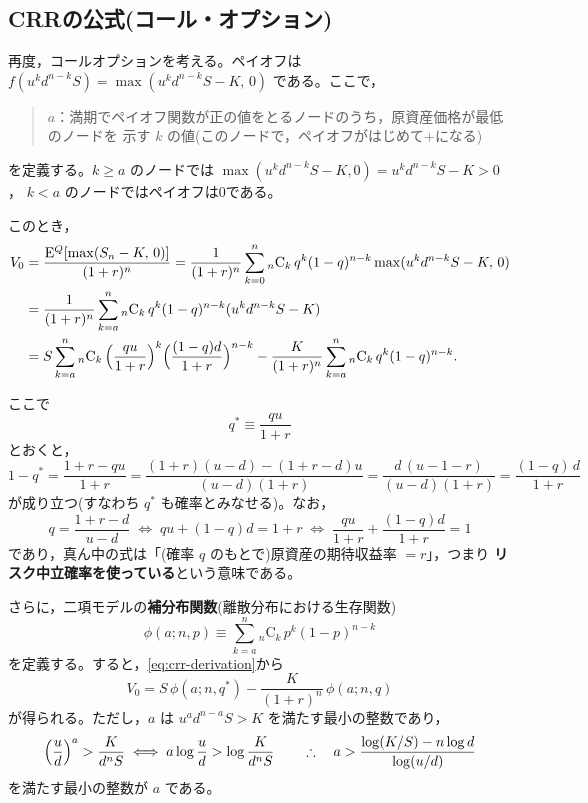 \subsection{CRRの公式(コール・オプション)}

再度，コールオプションを考える。ペイオフは
$f(u^kd^{n-k}S) = \max(u^kd^{n-k}S - K,\,0)$ である。ここで，
\begin{quote}
$a$：満期でペイオフ関数が正の値をとるノードのうち，原資産価格が最低のノードを
示す $k$ の値(このノードで，ペイオフがはじめて$+$になる)
\end{quote}
を定義する。$k\geq a$ のノードでは $\max(u^kd^{n-k}S-K,0) = u^kd^{n-k}S-K > 0$，
$k<a$ のノードではペイオフは0である。

このとき，
\begin{align}
V_0 &= \frac{\mathrm{E}^Q[\max(S_n - K,\,0)]}{(1+r)^n}
= \frac{1}{(1+r)^n}\sum_{k=0}^{n}{}_n\mathrm{C}_k\,q^k(1-q)^{n-k}
\max(u^kd^{n-k}S - K,\,0)\notag\\
&= \frac{1}{(1+r)^n}\sum_{k=a}^{n}{}_n\mathrm{C}_k\,q^k(1-q)^{n-k}
(u^kd^{n-k}S - K)\notag\\
&= S\sum_{k=a}^{n}{}_n\mathrm{C}_k\,
\Bigl(\frac{qu}{1+r}\Bigr)^k\Bigl(\frac{(1-q)d}{1+r}\Bigr)^{n-k}
- \frac{K}{(1+r)^n}\sum_{k=a}^{n}{}_n\mathrm{C}_k\,q^k(1-q)^{n-k}.
\label{eq:crr-derivation}
\end{align}

ここで
\begin{equation}
q^* \equiv \frac{qu}{1+r}
\end{equation}
とおくと，
\begin{equation}
1 - q^* = \frac{1+r - qu}{1+r}
= \frac{(1+r)(u-d) - (1+r-d)u}{(u-d)(1+r)}
= \frac{d\,(u - 1 - r)}{(u-d)(1+r)}
= \frac{(1-q)\,d}{1+r}
\end{equation}
が成り立つ(すなわち $q^*$ も確率とみなせる)。なお，
\[
q = \frac{1+r-d}{u-d}
\;\Longleftrightarrow\;
qu + (1-q)d = 1+r
\;\Longleftrightarrow\;
\frac{qu}{1+r} + \frac{(1-q)d}{1+r} = 1
\]
であり，真ん中の式は「(確率 $q$ のもとで)原資産の期待収益率 $= r$」，つまり
\textbf{リスク中立確率を使っている}という意味である。

さらに，二項モデルの\textbf{補分布関数}(離散分布における生存関数)
\begin{equation}
\phi(a; n, p) \equiv \sum_{k=a}^{n}{}_n\mathrm{C}_k\,p^k(1-p)^{n-k}
\end{equation}
を定義する。すると，\eqref{eq:crr-derivation}から
\begin{equation}
\boxed{\;
V_0 = S\,\phi(a; n, q^*) - \frac{K}{(1+r)^n}\,\phi(a; n, q)
\;}
\label{eq:crr-call}
\end{equation}
が得られる。ただし，$a$ は $u^ad^{n-a}S > K$ を満たす最小の整数であり，
\begin{equation}
\Bigl(\frac{u}{d}\Bigr)^a > \frac{K}{d^nS}
\;\Longleftrightarrow\;
a\log\frac{u}{d} > \log\frac{K}{d^nS}
\qquad\therefore\quad
a > \frac{\log(K/S) - n\log d}{\log(u/d)}
\label{eq:crr-a}
\end{equation}
を満たす最小の整数が $a$ である。

